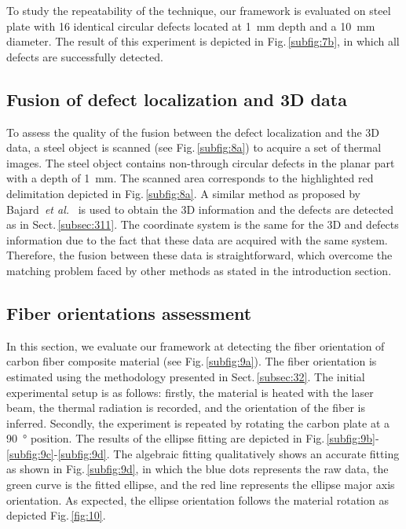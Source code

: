 \documentclass[12pt]{spieman}
\begin{document}
\begin{spacing}{2}
To study the repeatability of the technique, our framework is evaluated on steel plate with 16 identical circular defects located at \SI{1}{\milli \metre} depth and a \SI{10}{\milli \metre} diameter. 
The result of this experiment is depicted in Fig.\,\ref{subfig:7b}, in which all defects are successfully detected.



\subsection{Fusion of defect localization and 3D data}

To assess the quality of the fusion between the defect localization and the 3D data, a steel object is scanned (see Fig.\,\ref{subfig:8a}) to acquire a set of thermal images.
The steel object contains non-through circular defects in the planar part with a depth of \SI{1}{\milli \metre}.
The scanned area corresponds to the highlighted red delimitation depicted in Fig.\,\ref{subfig:8a}.
A similar method as proposed by Bajard~\emph{et al.}~\cite{Bajard2012} is used to obtain the 3D information and the defects are detected as in Sect.\,\ref{subsec:311}.
The coordinate system is the same for the 3D and defects information due to the fact that these data are acquired with the same system.
Therefore, the fusion between these data is straightforward, which overcome the matching problem faced by other methods as stated in the introduction section.


\subsection{Fiber orientations assessment}

In this section, we evaluate our framework at detecting the fiber orientation of carbon fiber composite material (see Fig.\,\ref{subfig:9a}).
The fiber orientation is estimated using the methodology presented in Sect.\,\ref{subsec:32}.
The initial experimental setup is as follows: 
firstly, the material is heated with the laser beam, the thermal radiation is recorded, and the orientation of the fiber is inferred. 
Secondly, the experiment is repeated by rotating the carbon plate at a \SI{90}{\degree} position.
The results of the ellipse fitting are depicted in Fig.\,\ref{subfig:9b}-\ref{subfig:9c}-\ref{subfig:9d}.
The algebraic fitting qualitatively shows an accurate fitting as shown in Fig.\,\ref{subfig:9d}, in which the blue dots represents the raw data, the green curve is the fitted ellipse, and the red line represents the ellipse major axis orientation.
As expected, the ellipse orientation follows the material rotation as depicted Fig.\,\ref{fig:10}.



\end{spacing}
\end{document}

